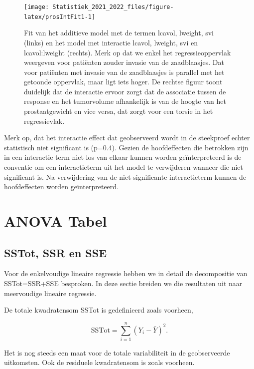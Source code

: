 \documentclass[
  12pt,dutch,coursenotes]{book}
\theoremstyle{definition}
\theoremstyle{definition}
\theoremstyle{definition}
\theoremstyle{definition}
\theoremstyle{remark}
\begin{document}
\begin{figure}

{\centering \texttt{[image: Statistiek\_2021\_2022\_files/figure-latex/prosIntFit1-1]} 

}

\caption{Fit van het additieve model met de termen lcavol, lweight, svi (links) en het model met interactie lcavol, lweight, svi en lcavol:lweight (rechts). Merk op dat we enkel het regressieoppervlak weergeven voor patiënten zouder invasie van de zaadblaasjes. Dat voor patiënten met invasie van de zaadblaasjes is parallel met het getoonde oppervlak, maar ligt iets hoger. De rechtse figuur toont duidelijk dat de interactie ervoor zorgt dat de associatie tussen de response en het tumorvolume afhankelijk is van de hoogte van het prostaatgewicht en vice versa, dat zorgt voor een torsie in het regressievlak.}\label{fig:prosIntFit1}
\end{figure}

Merk op, dat het interactie effect dat geobserveerd wordt in de steekproef echter statistisch niet significant is (p=0.4).
Gezien de hoofdeffecten die betrokken zijn in een interactie term niet los van elkaar kunnen worden geïnterpreteerd is de conventie om een interactieterm uit het model te verwijderen wanneer die niet significant is. Na verwijdering van de niet-significante interactieterm kunnen de hoofdeffecten worden geïnterpreteerd.

\hypertarget{anova-tabel-2}{%
\section{ANOVA Tabel}\label{anova-tabel-2}}

\hypertarget{sstot-ssr-en-sse}{%
\subsection{SSTot, SSR en SSE}\label{sstot-ssr-en-sse}}

Voor de enkelvoudige lineaire regressie hebben we in detail de decompositie van SSTot=SSR+SSE besproken. In deze sectie breiden we die resultaten uit naar meervoudige lineaire regressie.

De totale kwadratensom SSTot is gedefinieerd zoals voorheen,

\[
  \text{SSTot} = \sum_{i=1}^n (Y_i - \bar{Y})^2.
\]

Het is nog steeds een maat voor de totale variabiliteit in de geobserveerde uitkomsten.
Ook de residuele kwadratensom is zoals voorheen.
\end{document}
